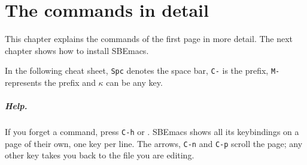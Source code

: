 \documentclass[a4paper,12pt,openany]{book}
\begin{document}
\chapter{The commands in detail}

This chapter explains the commands of the first page in more detail.
The next chapter shows how to install SBEmacs.

In the following cheat sheet, \verb|Spc| denotes
the space bar, \verb|C-| is the  prefix, \verb|M-| represents
the   prefix and  $\kappa$ can be any key.

\paragraph{Help.} If you forget a command, press \verb|C-h| or .
SBEmacs shows all its keybindings on a page of their own,
one key per line. The arrows, \verb|C-n| and \verb|C-p| scroll
the page; any other key takes you back to the file you are editing.
\end{document}
